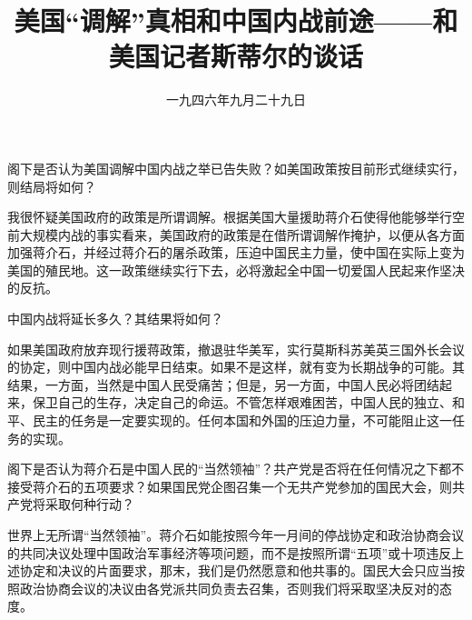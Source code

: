 
\date{一九四六年九月二十九日}
\title{美国“调解”真相和中国内战前途——和美国记者斯蒂尔的谈话}
\maketitle


阁下是否认为美国调解中国内战之举已告失败？如美国政策按目前形式继续实行，则结局将如何？

我很怀疑美国政府的政策是所谓调解。根据美国大量援助蒋介石使得他能够举行空前大规模内战的事实看来，美国政府的政策是在借所谓调解作掩护，以便从各方面加强蒋介石，并经过蒋介石的屠杀政策，压迫中国民主力量，使中国在实际上变为美国的殖民地。这一政策继续实行下去，必将激起全中国一切爱国人民起来作坚决的反抗。

中国内战将延长多久？其结果将如何？

如果美国政府放弃现行援蒋政策，撤退驻华美军，实行莫斯科苏美英三国外长会议的协定，则中国内战必能早日结束。如果不是这样，就有变为长期战争的可能。其结果，一方面，当然是中国人民受痛苦；但是，另一方面，中国人民必将团结起来，保卫自己的生存，决定自己的命运。不管怎样艰难困苦，中国人民的独立、和平、民主的任务是一定要实现的。任何本国和外国的压迫力量，不可能阻止这一任务的实现。

阁下是否认为蒋介石是中国人民的“当然领袖”？共产党是否将在任何情况之下都不接受蒋介石的五项要求？如果国民党企图召集一个无共产党参加的国民大会，则共产党将采取何种行动？

世界上无所谓“当然领袖”。蒋介石如能按照今年一月间的停战协定和政治协商会议的共同决议处理中国政治军事经济等项问题，而不是按照所谓“五项”或十项违反上述协定和决议的片面要求，那末，我们是仍然愿意和他共事的。国民大会只应当按照政治协商会议的决议由各党派共同负责去召集，否则我们将采取坚决反对的态度。


